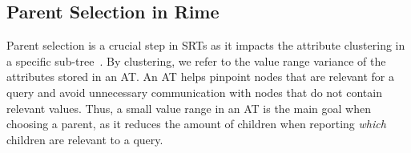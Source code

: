 
\subsection{Parent Selection in Rime}
\label{subsec:parent-selection}
% 
Parent selection is a crucial step in SRTs as it impacts the 
attribute clustering in a specific sub-tree~\cite{madden2005tinydb}.
% 
By clustering, we refer to the value range variance of the attributes stored in an AT.
An AT helps pinpoint nodes
that are relevant for a query and avoid unnecessary communication with nodes that do not contain relevant values. 
Thus, a small value range in an AT is the main goal when choosing a parent, as it reduces the amount of children when reporting \textit{which} children are relevant to a query.


